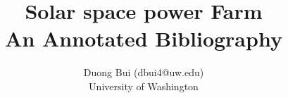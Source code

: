 \documentclass [11pt]{article}
\title{Solar space power Farm \\\medskip An Annotated Bibliography}
\author{Duong Bui (dbui4@uw.edu)\\University of Washington}
\begin{document}
%
%
\maketitle
\nocite{*}

%
%


\end{document}
